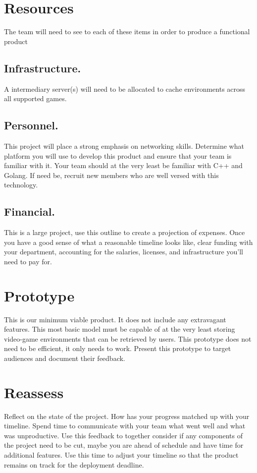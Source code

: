 \documentclass[12pt,journal,compsoc]{IEEEtran}
\begin{document}
\section{Resources} The team will need to see to each of these items in order to produce a functional product
    \subsection{Infrastructure.}\hphantom{m}A intermediary server(s) will need to be allocated to cache environments across all supported games.
    \subsection{Personnel.}\hphantom{m}This project will place a strong emphasis on networking skills. Determine what platform you will use to develop this product and ensure that your team is familiar with it. Your team should at the very least be familiar with C++ and Golang. If need be, recruit new members who are well versed with this technology.
    \subsection{Financial. }\hphantom{m}This is a large project, use this outline to create a projection of expenses. Once you have a good sense of what a reasonable timeline looks like, clear funding with your department, accounting for the salaries, licenses, and infrastructure you'll need to pay for.
    
\section{Prototype} This is our minimum viable product. It does not include any extravagant features. This most basic model must be capable of at the very least storing video-game environments that can be retrieved by users. This prototype does not need to be efficient, it only needs to work. Present this prototype to target audiences and document their feedback.

\section{Reassess} Reflect on the state of the project. How has your progress matched up with your timeline. Spend time to communicate with your team what went well and what was unproductive. Use this feedback to together consider if any components of the project need to be cut, maybe you are ahead of schedule and have time for additional features. Use this time to adjust your timeline so that the product remains on track for the deployment deadline.
\end{document}
